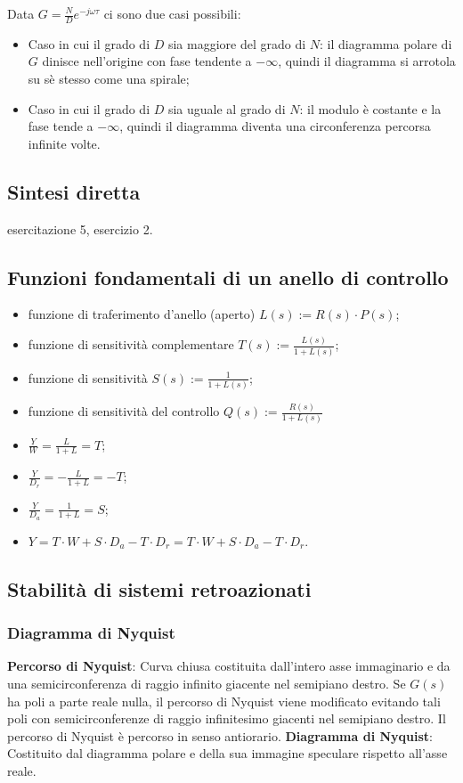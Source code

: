 \begin{landscape}
\begin{multicols*}{3}
\begin{center}
        \end{center}
        Data $G = \frac{N}{D} e^{- j \omega \tau}$ ci sono due casi possibili:
        \begin{itemize}
            \item Caso in cui il grado di $D$ sia maggiore del grado di $N$: il diagramma polare di $G$ dinisce nell'origine con fase tendente a $- \infty$, quindi il diagramma si arrotola su sè stesso come una spirale;
            \item Caso in cui il grado di $D$ sia uguale al grado di $N$: il modulo è costante e la fase tende a $- \infty$, quindi il diagramma diventa una circonferenza percorsa infinite volte.
        \end{itemize}
    \subsection*{Sintesi diretta}
    esercitazione 5, esercizio 2.
    \subsection*{Funzioni fondamentali di un anello di controllo}
    \begin{itemize}
        \item funzione di traferimento d'anello (aperto) $L(s) := R(s) \cdot P(s)$;
        \item funzione di sensitività complementare $T(s) := \frac{L(s)}{1+ L(s)}$;
        \item funzione di sensitività $S(s) := \frac{1}{1+ L(s)}$;
        \item funzione di sensitività del controllo $Q(s) := \frac{R(s)}{1+L(s)}$
        \item $\frac{Y}{W} = \frac{L}{1+L} = T$;
        \item $\frac{Y}{D_r} = - \frac{L}{1+L} = -T$;
        \item $\frac{Y}{D_a} = \frac{1}{1+L} = S$;
        \item $Y = T \cdot W + S \cdot  D_a -T \cdot D_r = T \cdot W + S \cdot D_a - T \cdot D_r$.
    \end{itemize}
    \subsection*{Stabilità di sistemi retroazionati}
    \subsubsection*{Diagramma di Nyquist}
    \textbf{Percorso di Nyquist}: Curva chiusa costituita dall'intero asse immaginario e da una semicirconferenza di raggio infinito giacente nel semipiano destro. Se $G(s)$ ha poli a parte reale nulla, il percorso di Nyquist viene modificato evitando tali poli con semicirconferenze di raggio infinitesimo giacenti nel semipiano destro. Il percorso di Nyquist è percorso in senso antiorario.\newline
    \newline
    \textbf{Diagramma di Nyquist}: Costituito dal diagramma polare e della sua immagine speculare rispetto all'asse reale.

\end{multicols*}
\end{landscape}
